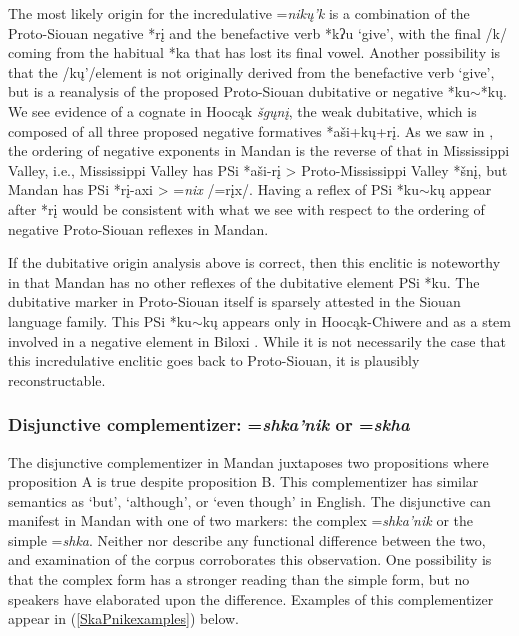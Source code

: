 The most likely origin for the incredulative =\textit{nikų'k} is a combination of the Proto-Siouan negative *rį and the benefactive verb *kʔu `give', with the final /k/ coming from the habitual *ka that has lost its final vowel. Another possibility is that the /{kų'}/element is not originally derived from the benefactive verb `give', but is a reanalysis of the proposed Proto-Siouan dubitative or negative *ku$\sim$*kų. We see evidence of a cognate in Hoocąk \textit{šgųnį}, the weak dubitative, which is composed of all three proposed negative formatives *aši+kų+rį. As we saw in , the ordering of negative exponents in Mandan is the reverse of that in Mississippi Valley, i.e., Mississippi Valley has PSi *aši-rį > Proto-Mississippi Valley *šnį, but Mandan has PSi *rį-axi > =\textit{nix} /=rįx/. Having a reflex of PSi *ku$\sim$kų appear after *rį would be consistent with what we see with respect to the ordering of negative Proto-Siouan reflexes in Mandan.

If the dubitative origin analysis above is correct, then this enclitic is noteworthy in that Mandan has no other reflexes of the dubitative element PSi *ku. The dubitative marker in Proto-Siouan itself is sparsely attested in the Siouan language family. This PSi *ku$\sim$kų appears only in Hoocąk-Chiwere and as a stem involved in a negative element in Biloxi \citep{rankin2015}. While it is not necessarily the case that this incredulative enclitic goes back to Proto-Siouan, it is plausibly reconstructable.

\subsubsection{Disjunctive complementizer: =\textit{shka'nik} or =\textit{skha}}

The disjunctive complementizer in Mandan juxtaposes two propositions where proposition A is true despite proposition B. This complementizer has similar semantics as `but', `although', or `even though' in English. The disjunctive can manifest in Mandan with one of two markers: the complex =\textit{shka'nik} or the simple =\textit{shka}. Neither \citet[22]{kennard1936} nor \citet[61]{mixco1997a} describe any functional difference between the two, and examination of the corpus corroborates this observation. One possibility is that the complex form has a stronger reading than the simple form, but no speakers have elaborated upon the difference. Examples of this complementizer appear in (\ref{SkaPnikexamples}) below.



